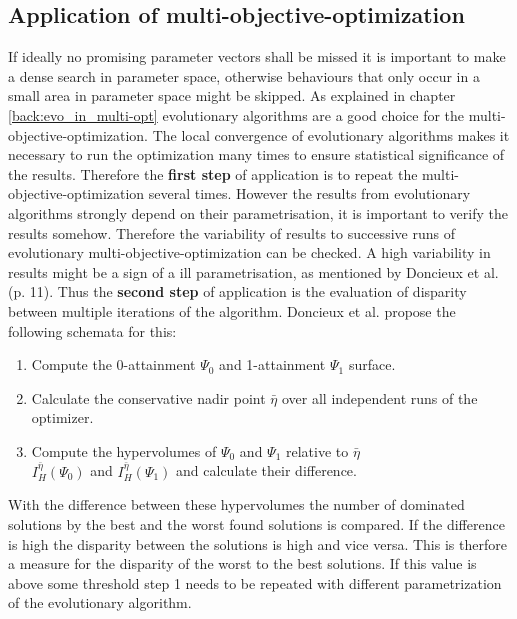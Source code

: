 \documentclass[12pt,twoside]{article}
\theoremstyle{plain}
\theoremstyle{definition}
\theoremstyle{remark}
\begin{document}
\subsection{Application of multi-objective-optimization}
If ideally no promising parameter vectors shall be missed it is important to make a dense search in parameter space, otherwise behaviours that only occur in a small area in parameter space might be skipped.
As explained in chapter \ref{back:evo_in_multi-opt} evolutionary algorithms are a good choice for the multi-objective-optimization.
The local convergence of evolutionary algorithms makes it necessary to run the optimization many times to ensure statistical significance of the results. Therefore the \textbf{first step} of application is to repeat the multi-objective-optimization several times.
However the results from evolutionary algorithms strongly depend on their parametrisation, it is important to verify the results somehow.
Therefore the variability of results to successive runs of evolutionary multi-objective-optimization can be checked.
A high variability in results might be a sign of a ill parametrisation, as mentioned by Doncieux et al. \cite{doncieux2015multi} (p. 11).
Thus the \textbf{second step} of application is the evaluation of disparity between multiple iterations of the algorithm. Doncieux et al. propose the following schemata for this:
\begin{enumerate}
	\item Compute the 0-attainment $\Psi_0$ and 1-attainment $\Psi_1$ surface.
	\item Calculate the conservative nadir point $\bar{\eta}$ over all independent runs of the optimizer.
	\item Compute the hypervolumes of $\Psi_0$ and $\Psi_1$ relative to $\bar{\eta}$\\ $I^{\bar{\eta}}_H(\Psi_0)$ and $I^{\bar{\eta}}_H(\Psi_1)$ and calculate their difference.
\end{enumerate}
With the difference between these hypervolumes the number of dominated solutions by the best and the worst found solutions is compared. If the difference is high the disparity between the solutions is high and vice versa. This is therfore a measure for the disparity of the worst to the best solutions. If this value is above some threshold step 1 needs to be repeated with different parametrization of the evolutionary algorithm.\\
\end{document}
